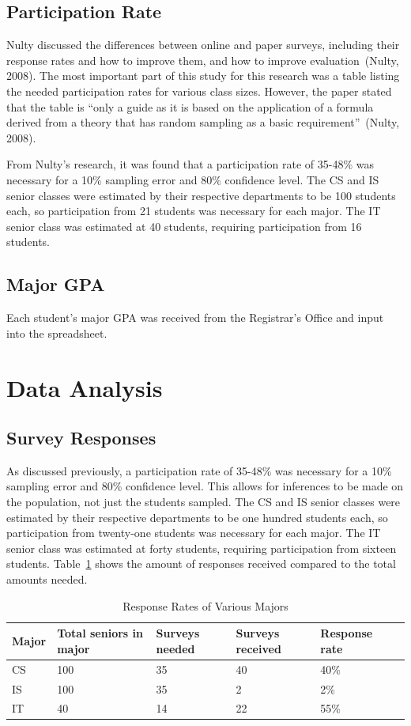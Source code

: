 \subsection{Participation Rate}
Nulty discussed the differences between online and paper surveys, including their response rates and how to improve them, and how to improve evaluation~(Nulty, 2008). The most important part of this study for this research was a table listing the needed participation rates for various class sizes. However, the paper stated that the table is ``only a guide as it is based on the application of a formula derived from a theory that has random sampling as a basic requirement''~(Nulty, 2008).

From Nulty's research, it was found that a participation rate of 35-48\% was necessary for a 10\% sampling error and 80\% confidence level. The CS and IS senior classes were estimated by their respective departments to be 100 students each, so participation from 21 students was necessary for each major. The IT senior class was estimated at 40 students, requiring participation from 16 students.

\subsection{Major GPA}
Each student's major GPA was received from the Registrar's Office and input into the spreadsheet.

\section{Data Analysis}
\subsection{Survey Responses}
As discussed previously, a participation rate of 35-48\% was necessary for a 10\% sampling error and 80\% confidence level. This allows for inferences to be made on the population, not just the students sampled. The CS and IS senior classes were estimated by their respective departments to be one hundred students each, so participation from twenty-one students was necessary for each major. The IT senior class was estimated at forty students, requiring participation from sixteen students. Table~\ref{tab:c-response-rates} shows the amount of responses received compared to the total amounts needed.

\begin{table}[h!]
  \centering
  \caption{Response Rates of Various Majors}
  \label{tab:c-response-rates}
  \begin{tabular}{llllll}
    \toprule
    Major & Total seniors in major & Surveys needed & Surveys received & Response rate\\
    \midrule
    CS    & 100                    & 35             & 40               & 40\%\\
    IS    & 100                    & 35             & 2                & 2\%\\
    IT    & 40                     & 14             & 22               & 55\%\\
    \bottomrule
  \end{tabular}
\end{table}

